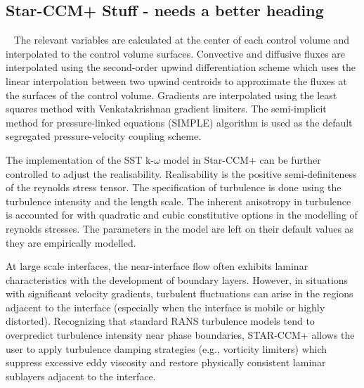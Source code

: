 \subsection{Star-CCM+ Stuff - needs a better heading}
~
The relevant variables are
 calculated at the center of each control volume and interpolated to the control volume surfaces.
 Convective and diffusive fluxes are interpolated using the second-order upwind differentiation
 scheme which uses the linear interpolation between two upwind centroids to approximate
 the fluxes at the surfaces of the control volume. Gradients are interpolated using 
 the least squares method with Venkatakrishnan gradient limiters.
 The semi-implicit method for pressure-linked equations (SIMPLE) algorithm is used 
 as the default segregated pressure-velocity coupling scheme. 
~


The implementation of the SST k-$\omega$ model in Star-CCM+ can be further controlled to
 adjust the realisability. Realisability is the positive semi-definiteness of the 
 reynolds stress tensor. The specification of turbulence is done using
 the turbulence intensity and the length scale. The inherent anisotropy 
 in turbulence is accounted for with quadratic and cubic constitutive options
 in the modelling of reynolds stresses. The parameters in the model
 are left on their default values as they are empirically modelled.

 At large scale interfaces, the near-interface flow often exhibits
 laminar characteristics with the development of boundary layers. However, in situations
 with significant velocity gradients, turbulent fluctuations can arise in the
 regions adjacent to the interface (especially when the interface is mobile or
 highly distorted). Recognizing that standard RANS turbulence
 models tend to overpredict turbulence intensity near phase boundaries,
 STAR-CCM+ allows the user to apply turbulence damping strategies
 (e.g., vorticity limiters) which suppress excessive eddy viscosity and
 restore physically consistent laminar sublayers adjacent to the interface.

